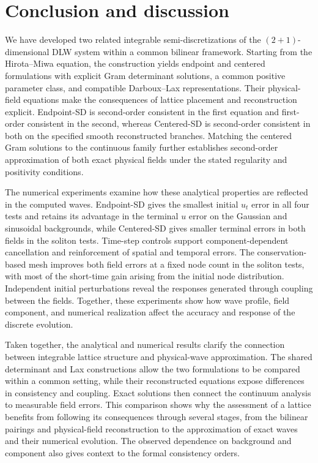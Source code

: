 \documentclass{article}
\theoremstyle{plain}
\theoremstyle{definition}
\begin{document}
\FloatBarrier
\section{Conclusion and discussion}

We have developed two related integrable semi-discretizations of the \((2+1)\)-dimensional DLW system within a common bilinear framework. Starting from the Hirota–Miwa equation, the construction yields endpoint and centered formulations with explicit Gram determinant solutions, a common positive parameter class, and compatible Darboux–Lax representations. Their physical-field equations make the consequences of lattice placement and reconstruction explicit. Endpoint-SD is second-order consistent in the first equation and first-order consistent in the second, whereas Centered-SD is second-order consistent in both on the specified smooth reconstructed branches. Matching the centered Gram solutions to the continuous family further establishes second-order approximation of both exact physical fields under the stated regularity and positivity conditions.

The numerical experiments examine how these analytical properties are reflected in the computed waves. Endpoint-SD gives the smallest initial \(u_t\) error in all four tests and retains its advantage in the terminal \(u\) error on the Gaussian and sinusoidal backgrounds, while Centered-SD gives smaller terminal errors in both fields in the soliton tests. Time-step controls support component-dependent cancellation and reinforcement of spatial and temporal errors. The conservation-based mesh improves both field errors at a fixed node count in the soliton tests, with most of the short-time gain arising from the initial node distribution. Independent initial perturbations reveal the responses generated through coupling between the fields. Together, these experiments show how wave profile, field component, and numerical realization affect the accuracy and response of the discrete evolution.

Taken together, the analytical and numerical results clarify the connection between integrable lattice structure and physical-wave approximation. The shared determinant and Lax constructions allow the two formulations to be compared within a common setting, while their reconstructed equations expose differences in consistency and coupling. Exact solutions then connect the continuum analysis to measurable field errors. This comparison shows why the assessment of a lattice benefits from following its consequences through several stages, from the bilinear pairings and physical-field reconstruction to the approximation of exact waves and their numerical evolution. The observed dependence on background and component also gives context to the formal consistency orders.
\end{document}
